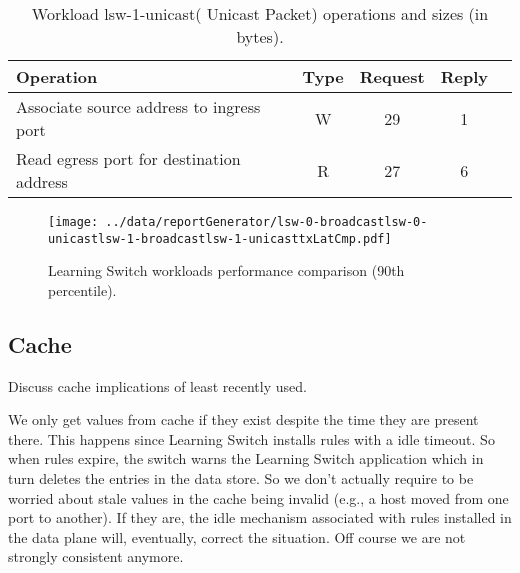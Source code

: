 \documentclass[12pt,openright,twoside]{report}
\begin{document}
\begin{table}[ht]
\centering 
\begin{tabular}{l c c c c}
 Operation & Type & Request & Reply \\ \toprule 
Associate source address to ingress port & W & 29 & 1\\\midrule
Read egress port for destination address & R & 27 & 6 \\\bottomrule
\end{tabular}
\caption[Workload lsw-1-unicast( Unicast Packet) operations]{Workload lsw-1-unicast( Unicast Packet) operations and sizes (in bytes).}
\label{table:lsw1:unicast}
\end{table}

\begin{figure}[ht]
\centering
\texttt{[image: ../data/reportGenerator/lsw-0-broadcastlsw-0-unicastlsw-1-broadcastlsw-1-unicasttxLatCmp.pdf]}
\caption[Learning Switch workloads performance comparison]{Learning Switch workloads performance comparison (90th percentile). }
\end{figure}
\subsection{Cache}

\label{sec.learning.switch.lru.cache} Discuss cache implications of
least recently used. 

We only get values from cache if they exist despite the time they are
present there. This happens since Learning Switch installs rules with
a idle timeout. So when rules expire, the switch warns the Learning
Switch application which in turn deletes the entries in the data
store. So we don't actually require to be worried about stale values
in the cache being invalid (e.g., a host moved from one port to
another). If they are, the idle mechanism associated with rules
installed in the data plane will, eventually, correct the situation.
Off course we are not strongly consistent anymore. 
\end{document}
